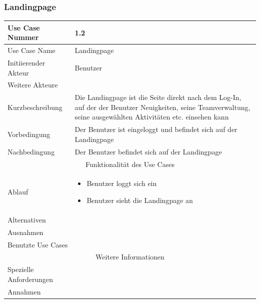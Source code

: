 \documentclass[10pt,a4paper]{article}
\begin{document}
		\subsubsection{Landingpage}
		\begin{tabular}{|l|p{.5\linewidth}|}
			\hline Use Case Nummer & 1.2 \\ 
			\hline Use Case Name & Landingpage \\ 
			\hline Initiierender Akteur & Benutzer \\
			\hline Weitere Akteure &  \\
			\hline Kurzbeschreibung & Die Landingpage ist die Seite direkt nach dem Log-In, auf der der Benutzer Neuigkeiten, seine Teamverwaltung, seine ausgewählten Aktivitäten etc. einsehen kann \\
			\hline Vorbedingung & Der Benutzer ist eingeloggt und befindet sich auf der Landingpage \\
			\hline Nachbedingung & Der Benutzer befindet sich auf der Landingpage \\
			\hline \multicolumn{2}{|c|}{Funktionalität des Use Cases}\\
			\hline Ablauf & \begin{itemize}
				\item Benutzer loggt sich ein
				\item Benutzer sieht die Landingpage an
			\end{itemize} \\
			\hline Alternativen & \\
			\hline Ausnahmen & \\
			\hline Benutzte Use Cases & \\
			\hline \multicolumn{2}{|c|}{Weitere Informationen} \\
			\hline Spezielle Anforderungen & \\
			\hline Annahmen & \\
			\hline
		\end{tabular}
		
\end{document}
